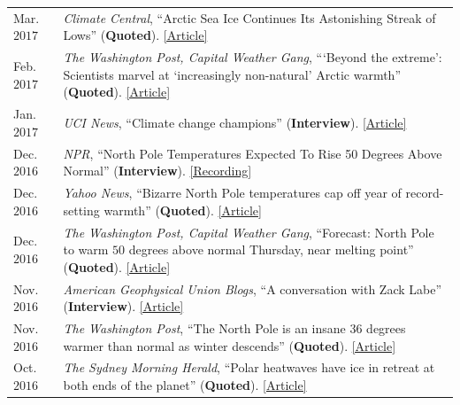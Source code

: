 \documentclass[margin,line,palatino,courier,10pt]{res}
\begin{document}
\begin{resume}
\begin{tabular}{@{}p{0.8in}p{4in}}
Mar. $2017$ & \textit{Climate Central}, ``Arctic Sea Ice Continues Its Astonishing Streak of Lows'' (\textbf{Quoted}). \href{http://www.climatecentral.org/news/arctic-sea-ice-record-low-streak-21227}{[Article]}\\
Feb. $2017$ & \textit{The Washington Post, Capital Weather Gang}, ```Beyond the extreme': Scientists marvel at `increasingly non-natural' Arctic warmth'' (\textbf{Quoted}). \href{https://www.washingtonpost.com/news/capital-weather-gang/wp/2017/02/01/beyond-the-extreme-scientists-marvel-at-increasingly-non-natural-arctic-warmth/?sdfsdfsdfsdfsd&utm_term=.cf3cf81d24f3}{[Article]}\\
Jan. $2017$ & \textit{UCI News}, ``Climate change champions'' (\textbf{Interview}). \href{https://news.uci.edu/climate-change-champions/}{[Article]}\\
Dec. $2016$ & \textit{NPR}, ``North Pole Temperatures Expected To Rise 50 Degrees Above Normal'' (\textbf{Interview}). \href{http://www.npr.org/2016/12/21/506483966/north-pole-temperatures-expected-to-rise-50-degrees-above-normal}{[Recording]}\\
Dec. $2016$ & \textit{Yahoo News}, ``Bizarre North Pole temperatures cap off year of record-setting warmth'' (\textbf{Quoted}). \href{https://www.yahoo.com/news/bizarre-north-pole-temperatures-cap-off-year-of-record-setting-warmth-181727978.html?soc_src=social-sh&soc_trk=tw}{[Article]}\\
Dec. $2016$ & \textit{The Washington Post, Capital Weather Gang}, ``Forecast: North Pole to warm $50$ degrees above normal Thursday, near melting point'' (\textbf{Quoted}). \href{https://www.washingtonpost.com/news/capital-weather-gang/wp/2016/12/20/forecast-north-pole-to-warm-50-degrees-above-normal-thursday-near-melting-point/?dfgdfgdfgdfg&utm_term=.e648369ada7e}{[Article]}\\
Nov. $2016$ & \textit{American Geophysical Union Blogs}, ``A conversation with Zack Labe'' (\textbf{Interview}). \href{http://blogs.agu.org/mountainbeltway/2016/11/23/conversation-zack-labe/}{[Article]}\\
Nov. $2016$ & \textit{The Washington Post}, ``The North Pole is an insane 36 degrees warmer than normal as winter descends'' (\textbf{Quoted}). \href{https://www.washingtonpost.com/news/energy-environment/wp/2016/11/17/the-north-pole-is-an-insane-36-degrees-warmer-than-normal-as-winter-descends/?utm_term=.f2cb9596b3d8}{[Article]}\\
Oct. $2016$ & \textit{The Sydney Morning Herald}, ``Polar heatwaves have ice in retreat at both ends of the planet'' (\textbf{Quoted}). \href{http://www.smh.com.au/environment/climate-change/polar-heatwaves-have-ice-in-retreat-at-both-ends-of-the-planet-20161030-gse9q6.html}{[Article]}\\

\end{tabular}
\end{resume}
\end{document}

